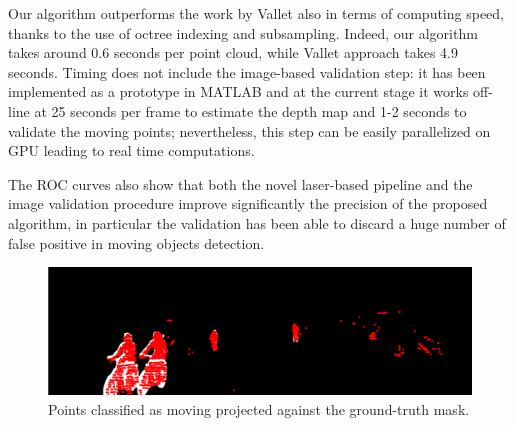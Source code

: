 Our algorithm outperforms the work by Vallet \etal also in terms of computing speed, thanks to the use of octree indexing and subsampling. 
Indeed, our algorithm takes around 0.6 seconds per point cloud, while Vallet \etal approach takes 4.9 seconds.
Timing does not include the image-based validation step: it has been implemented as a prototype in MATLAB and at the current stage it works off-line at 25 seconds per frame to estimate the depth map and 1-2 seconds to validate the moving points; nevertheless, this step can be easily parallelized on GPU leading to real time computations.

The ROC curves also show that both the novel laser-based pipeline and the image validation procedure improve significantly the precision of the proposed algorithm, in particular the validation has been able to discard a huge number of false positive in moving objects detection.


\begin{figure}[t]
\centering
\includegraphics[width=0.98\columnwidth]{./img/ch-laser/points_result_on_mask}
\caption{Points classified as moving projected against the ground-truth mask.} 
\label{fig:points}
\end{figure}




